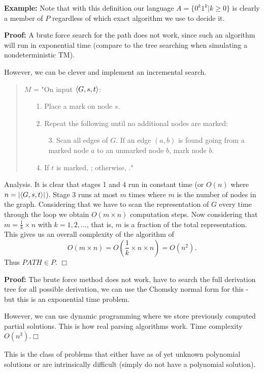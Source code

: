 \documentclass[a4paper,blends,pdf,colorBG,slideColor]{prosper}
\begin{document}
{\bf Example:} Note that with this definition our language $A=\{0^k 1^k | k \ge 0\}$ is clearly a member
of $P$ regardless of which exact algorithm we use to decide it.
\es

{\small
{}

\scriptsize
{\bf Proof:}  A brute force search for the path does not work, since such an algorithm will run in exponential time (compare to the tree searching when simulating a nondeterministic TM).

However, we can be clever and implement an incremental search.
\begin{quote}
$M$ = "On input $\langle {G,s,t} \rangle$:
\begin{itemize}
\item[1.] Place a mark on node $s$.
\item[2.] Repeat the following until no additional nodes are marked:
\begin{itemize}
\item[3.] Scan all edges of $G$.  If an edge $(a,b)$ is found going from a marked node $a$ to
an unmarked node $b$, mark node $b$.
\end{itemize}
\item[4.] If $t$ is marked, \accept; otherwise, \reject."
\end{itemize}
\end{quote}
Analysis. It is clear that stages 1 and 4 run in constant time (or $O(n)$ where $n = |\langle {G,s,t} \rangle|$).
Stage 3 runs at most $m$ times where $m$ is the number of nodes in the graph.  Considering that we have to scan the representation of $G$ every time through the loop we obtain $O(m\times n)$ computation
steps.  Now considering that $m = \frac{1}{k}\times n$ with $k=1,2,\ldots$, that is, $m$ is a fraction of the total representation.
This gives us an overall complexity of the algorithm of 
\[
O(m\times n) = O( \frac{1}{k}\times n \times n) = O(n^2).
\]
Thus $PATH \in P$. $\Box$
}
\es



{\bf Proof:} The brute force method does not work, have to search the full derivation tree for all possible derivation,
we can use the Chomsky normal form for this - but this is an exponential time problem.

However, we can use dynamic programming where we store previously computed partial solutions.  This is
how real parsing algorithms work.  Time complexity $O(n^3)$.$\Box$

\es

This is the class of problems that either have as of yet unknown polynomial solutions or are intrinsically difficult (simply do not have a polynomial solution).


\fdef{
\[
NP = \bigcup_k NTIME(n^k), \mbox{ for $k \ge 0$}.
\]}
\es
\end{document}
